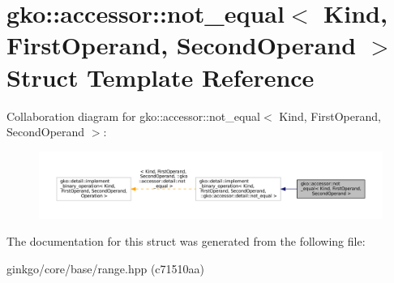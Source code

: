 \hypertarget{structgko_1_1accessor_1_1not__equal}{}\section{gko\+:\+:accessor\+:\+:not\+\_\+equal$<$ Kind, First\+Operand, Second\+Operand $>$ Struct Template Reference}
\label{structgko_1_1accessor_1_1not__equal}


Collaboration diagram for gko\+:\+:accessor\+:\+:not\+\_\+equal$<$ Kind, First\+Operand, Second\+Operand $>$\+:
\nopagebreak
\begin{figure}[H]
\begin{center}
\leavevmode
\includegraphics[width=350pt]{structgko_1_1accessor_1_1not__equal__coll__graph}
\end{center}
\end{figure}


The documentation for this struct was generated from the following file\+:\begin{DoxyCompactItemize}
\item 
ginkgo/core/base/range.\+hpp (c71510aa)\end{DoxyCompactItemize}
